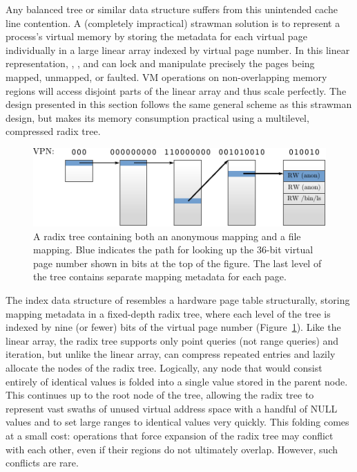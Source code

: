 Any balanced tree or similar data structure suffers from this unintended
cache line contention.  A (completely impractical) strawman solution is
to represent a process's virtual memory by storing the metadata for each
virtual page individually in a large linear array indexed by virtual
page number.  In this linear representation, , ,
and  can lock and manipulate precisely the pages being
mapped, unmapped, or faulted.  VM operations on non-overlapping
memory regions will access disjoint parts of the linear array
and thus scale perfectly.  The design presented in this section follows
the same general scheme as this strawman design, but makes its memory
consumption practical using a multilevel, compressed radix tree.

\begin{figure}
\centering
\includegraphics{figures/radix.pdf}
\caption{A radix tree containing both an anonymous mapping
  and a file mapping.  Blue indicates the path for looking up the 36-bit
  virtual page number shown in bits at the top of the figure.  The last
  level of the tree contains separate mapping metadata for each page.
}
\label{fig:radix}
\end{figure}

The index data structure of \vm resembles a hardware page table
structurally, storing mapping metadata in a fixed-depth radix tree,
where each level of the tree is indexed by nine (or fewer) bits of the
virtual page number (Figure~\ref{fig:radix}).  Like the linear array,
the radix tree supports only point queries (not range queries) and
iteration, but unlike the linear array, \vm can compress repeated
entries and lazily allocate the nodes of the radix tree.  Logically,
any node that would consist entirely of identical values is folded
into a single value stored in the parent node.  This continues up to
the root node of the tree, allowing the radix tree to represent vast
swaths of unused virtual address space with a handful of NULL values
and to set large ranges to identical values very quickly.  This
folding comes at a small cost:  operations that force
expansion of the radix tree may conflict with each other, even if
their regions do not ultimately overlap.  However, such conflicts are
rare.

